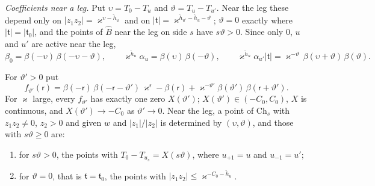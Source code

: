 \emph{Coefficients near a leg.} Put $\upsilon=T_0-T_u$ and $\vartheta=T_u-T_{u'}$. Near the leg these depend only on
$|z_1z_2|=\varkappa^{\upsilon-\check h_u}$ and on $|\mathfrak t|=\varkappa^{\check h_{u'}-\check h_u-\vartheta}$; $\vartheta=0$ exactly where
$|\mathfrak t|=|\mathfrak t_0|$, and the points of $\widehat B$ near the leg on side $s$ have $s\vartheta>0$.
Since only $0$, $u$ and $u'$ are active near the leg,
\begin{equation}\label{eq:legcoeff}
\beta_0=\beta(-\upsilon)\,\beta(-\upsilon-\vartheta),\qquad \varkappa^{\check h_u}\alpha_u=\beta(\upsilon)\,\beta(-\vartheta),\qquad
\varkappa^{\check h_u}\alpha_{u'}|\mathfrak t|=\varkappa^{-\vartheta}\,\beta(\upsilon+\vartheta)\,\beta(\vartheta).
\end{equation}

\begin{lemma}\label{lem:chamber}
For $\vartheta'>0$ put
\[
f_{\vartheta'}(\mathsf r)=\beta(-\mathsf r)\,\beta(-\mathsf r-\vartheta')\,\varkappa^{\mathsf r}-\beta(\mathsf r)+\varkappa^{-\vartheta'}\beta(\vartheta')\,\beta(\mathsf r+\vartheta') .
\]
For $\varkappa$ large, every $f_{\vartheta'}$ has exactly one zero $X(\vartheta')$; $X(\vartheta')\in(-C_0,C_0)$, $X$ is continuous, and
$X(\vartheta')\to-C_0$ as $\vartheta'\to0$. Near the leg, a point of $\mathrm{Ch}_s$ with $z_1z_2\neq0$, $z_2>0$ and
given $w$ and $|z_1|/|z_2|$ is determined by $(\upsilon,\vartheta)$, and those with $s\vartheta\ge0$ are:
\begin{enumerate}
\item for $s\vartheta>0$, the points with $T_0-T_{u_s}=X(s\vartheta)$, where $u_{+1}=u$ and
$u_{-1}=u'$;
\item for $\vartheta=0$, that is $\mathfrak t=\mathfrak t_0$, the points with $|z_1z_2|\le \varkappa^{-C_0-\check h_u}$.
\end{enumerate}
\end{lemma}
